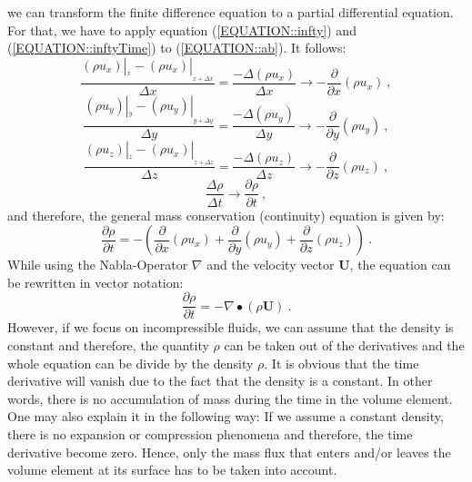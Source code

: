 \documentclass[MathematicsNumericsDerivationsAndOpenFOAM.tex]{subfiles}
\begin{document}
%
%
	we can transform the finite difference equation to a partial differential
    equation. For that, we have to apply equation (\ref{EQUATION::infty}) and
    (\ref{EQUATION::inftyTime}) to (\ref{EQUATION::ab}). It follows:
%
%
\begin{equation}
 \frac{(\rho u_x)|_{_x} - (\rho u_x)|_{_{x+\Delta x}}}{\Delta x} = \frac{-\Delta (\rho u_x)}{\Delta x}
\longrightarrow
-\frac{\partial}{\partial x} (\rho u_x)~,
\end{equation}
\begin{equation}
\frac{(\rho u_y)|_{_y} - (\rho u_y)|_{_{y+\Delta y}}}{\Delta y} = \frac{-\Delta (\rho u_y)}{\Delta y}
\longrightarrow
-\frac{\partial}{\partial y} (\rho u_y) ~,
\end{equation}
\begin{equation}
\frac{(\rho u_z)|_{_z} - (\rho u_x)|_{_{z+\Delta z}}}{\Delta z} = \frac{-\Delta (\rho u_z)}{\Delta z}
\longrightarrow
-\frac{\partial}{\partial z} (\rho u_z) ~,
\end{equation}
\begin{equation}
  \frac{\Delta \rho}{\Delta t} \to \frac{\partial \rho}{\partial t} ~,
\end{equation}
%
%
%
%
	and therefore, the general mass conservation (continuity) equation is
    given by:
%
%
\begin{equation}
\boxed{
 \frac{\partial \rho}{\partial t} =
 - \left(
      \frac{\partial}{\partial x} (\rho u_x)
    + \frac{\partial}{\partial y} (\rho u_y)
    + \frac{\partial}{\partial z} (\rho u_z)
   \right)
   } ~.
\end{equation}
%
%
	While using the Nabla-Operator $\nabla$ and the velocity vector
    \textbf{U}, the equation can be rewritten in vector notation:
%
%
\begin{equation}
\boxed{
 \frac{\partial \rho}{\partial t} =
 -   \nabla \bullet \left(\rho \textbf{U}\right)
   } ~.
   \label{EQUATION::massCompressible}
\end{equation}
%
%
	However, if we focus on incompressible fluids, we can assume that the
    density is constant and therefore, the quantity $\rho$ can be taken out of
    the derivatives and the whole equation can be divide by the density $\rho$.
    It is obvious that the time derivative will vanish due to the fact that
    the density is a constant. In other words, there is no accumulation of
    mass during the time in the volume element.
    One may also explain it in the following way: If we assume a constant
    density, there is no expansion or compression phenomena and therefore,
    the time derivative become zero. Hence, only the mass flux that enters
    and/or leaves the volume element at its surface has to be taken into account.
\end{document}
